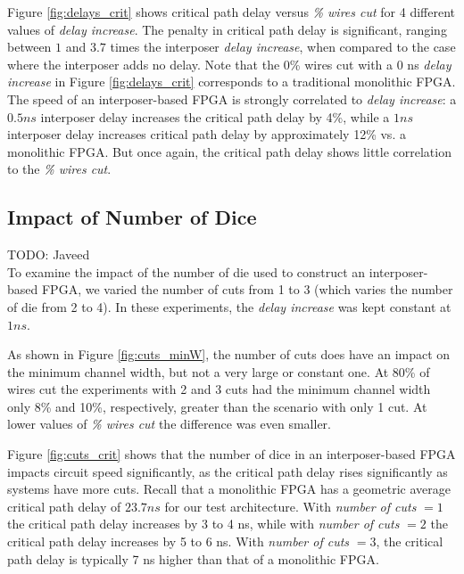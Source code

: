\documentclass{sig-alternate-2013}
\begin{document}
Figure \ref{fig:delays_crit} shows critical path delay versus \textit{\% wires cut} for 4 different values of \textit{delay increase}. The penalty in critical path delay is significant, ranging between $1$ and $3.7$ times the interposer \textit{delay increase}, when compared to the case where the interposer adds no delay. Note that the 0\% wires cut with a 0 ns \textit{delay increase} in Figure \ref{fig:delays_crit} corresponds to a traditional monolithic FPGA. The speed of an interposer-based FPGA is strongly correlated to \textit{delay increase}: a $0.5ns$ interposer delay increases the critical path delay by 4\%, while a $1ns$ interposer delay increases critical path delay by approximately 12\% vs. a monolithic FPGA. But once again, the critical path delay shows little correlation to the \textit{\% wires cut}.


\subsection{Impact of Number of Dice}
\label{num_dice_impact}
TODO: Javeed\\
To examine the impact of the number of die used to construct an interposer-based FPGA, we varied the number of cuts from 1 to 3 (which varies the number of die from 2 to 4).  In these experiments, the \textit{delay increase} was kept constant at $1ns$. 

As shown in Figure \ref{fig:cuts_minW}, the number of cuts does have an impact on the minimum channel width, but not a very large or constant one. At 80\% of wires cut the experiments with 2 and 3 cuts had the minimum channel width only 8\% and 10\%, respectively, greater than the scenario with only 1 cut. At lower values of \textit{\% wires cut} the difference was even smaller.

Figure \ref{fig:cuts_crit} shows that the number of dice in an interposer-based FPGA impacts circuit speed significantly, as the critical path delay rises significantly as systems have more cuts. Recall that a monolithic FPGA has a geometric average critical path delay of $23.7ns$ for our test architecture. With \textit{number of cuts} $= 1$ the critical path delay increases by 3 to 4 ns, while with \textit{number of cuts} $= 2$ the critical path delay increases by 5 to 6 ns. With \textit{number of cuts} $= 3$, the critical path delay is typically 7 ns higher than that of a monolithic FPGA.
\end{document}
